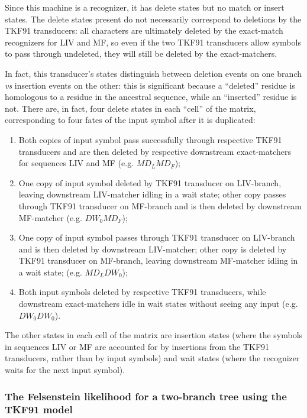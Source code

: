 \documentclass{article}
\begin{document}
Since this machine is a recognizer, it has delete states but no match or insert states.
The delete states present do not necessarily correspond to  deletions by the TKF91 transducers:
all characters are ultimately deleted by the exact-match recognizers for LIV and MF,
so even if the two TKF91 transducers allow symbols to pass through undeleted,
they will still be deleted by the exact-matchers.

In fact, this transducer's states distinguish between
deletion events on one branch {\em vs} insertion events on the other:
this is significant because a ``deleted'' residue is homologous to a residue in the ancestral sequence,
while an ``inserted'' residue is not.
There are, in fact, four delete states in each ``cell'' of the matrix,
corresponding to four fates of the input symbol after it is duplicated:
\begin{enumerate}
\item Both copies of input symbol pass successfully through respective TKF91 transducers
and are then deleted by respective downstream exact-matchers for sequences LIV and MF
 (e.g. $M D_L M D_F$);
\item One copy of input symbol deleted by TKF91 transducer on LIV-branch,
leaving downstream LIV-matcher idling in a wait state;
other copy passes through TKF91 transducer on MF-branch and is then deleted by downstream MF-matcher
 (e.g. $D W_0 M D_F$);
\item One copy of input symbol passes through TKF91 transducer on LIV-branch
and is then deleted by downstream LIV-matcher;
other copy is deleted by TKF91 transducer on MF-branch,
leaving downstream MF-matcher idling in a wait state;
 (e.g. $M D_L D W_0$);
\item Both input symbols deleted by respective TKF91 transducers,
while downstream exact-matchers idle in wait states without seeing any input
 (e.g. $D W_0 D W_0$).
\end{enumerate}
The other states in each cell of the matrix are insertion states
(where the symbols in sequences LIV or MF are accounted for by insertions from the TKF91 transducers,
rather than by input symbols)
and wait states (where the recognizer waits for the next input symbol).



\subsubsection{The Felsenstein likelihood for a two-branch tree using the TKF91 model}
\end{document}
